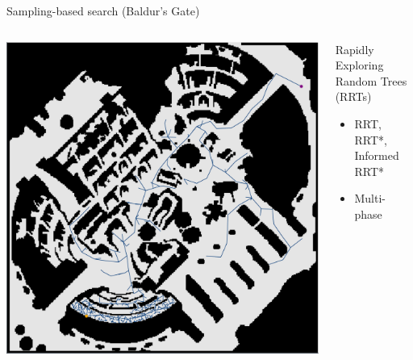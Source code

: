 \documentclass[aspectratio=169]{beamer}
\makeatletter
\newcommand{\white}[1]{{\color{pureminimalistic@text@white} #1}}
\newcommand{\red}[1]{{\color{pureminimalistic@text@red} #1}}
\makeatother
\begin{document}
\begin{frame}[plain]{Sampling-based search \white{(Baldur's Gate)}}
  \begin{columns}[T]
      \begin{column}{.35\linewidth}
      \vspace{0.05\textheight}
      \includegraphics[height=0.7\textheight, keepaspectratio]{figures/baldurs_rrt_one_off.pdf}
      \end{column}
      \begin{column}{.65\linewidth}
          \begin{vfilleditems}
              \item {\Large Rapidly Exploring Random Trees \red{(RRTs)}}
              \begin{itemize}
                  \item RRT, RRT*, Informed RRT*
                  \item Multi-phase

\end{itemize}
\end{vfilleditems}
\end{column}
\end{columns}
\end{frame}
\end{document}
